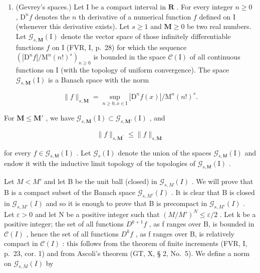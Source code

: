 \begin{enumerate}
\def\labelenumi{\alph{enumi})}
\setcounter{enumi}{2}
\tightlist
\item
  (Gevrey's spaces.) Let I be a compact interval in \(\mathbf{R}\) . For every integer \(n \geqslant 0\) , \(\mathrm{D}^n f\) denotes the \(n\) th derivative of a numerical function \(f\) defined on I (whenever this derivative exists). Let \(s \geqslant 1\) and \(\mathbf{M} \geqslant 0\) be two real numbers. Let \(\mathcal{G}_{s,\mathbf{M}}(\mathrm{I})\) denote the vector space of those infinitely differentiable functions \(f\) on I (FVR, I, p.~28) for which the sequence \((|\mathrm{D}^n f| / \mathrm{M}^n (n!)^s)_{n \geqslant 0}\) is bounded in the space \(\mathcal{C}(\mathrm{I})\) of all continuous functions on I (with the topology of uniform convergence). The space \(\mathcal{G}_{s,\mathbf{M}}(\mathrm{I})\) is a Banach space with the norm
\end{enumerate}

\[
\| f \| _ {s, \mathbf {M}} = \sup _ {n \geqslant 0, x \in \mathrm{I}} | \mathrm{D} ^ {n} f (x) | / \mathrm{M} ^ {n} (n!) ^ {s}.
\]

For \(\mathbf{M} \leqslant \mathbf{M}'\) , we have \(\mathcal{G}_{s,\mathbf{M}}(\mathrm{I}) \subset \mathcal{G}_{s,\mathbf{M}'}(\mathrm{I})\) , and

\[
\| f \| _ {s, \mathbf {M} ^ {\prime}} \leqslant \| f \| _ {s, \mathbf {M}}
\]

for every \(f \in \mathcal{G}_{s,\mathsf{M}}(\mathrm{I})\) . Let \(\mathcal{G}_s(\mathrm{I})\) denote the union of the spaces \(\mathcal{G}_{s,\mathsf{M}}(\mathrm{I})\) and endow it with the inductive limit topology of the topologies of \(\mathcal{G}_{s,\mathsf{M}}(\mathrm{I})\) .

Let \(M < M'\) and let B be the unit ball (closed) in \(\mathcal{G}_{s,M}(I)\) . We will prove that B is a compact subset of the Banach space \(\mathcal{G}_{s,M'}(I)\) . It is clear that B is closed in \(\mathcal{G}_{s,M'}(I)\) and so it is enough to prove that B is precompact in \(\mathcal{G}_{s,M'}(I)\) . Let \(\varepsilon > 0\) and let N be a positive integer such that \((M/M')^N \leqslant \varepsilon/2\) . Let k be a positive integer; the set of all functions \(D^{k+1}f\) , as f ranges over B, is bounded in \(\mathcal{C}(I)\) , hence the set of all functions \(D^k f\) , as f ranges over B, is relatively compact in \(\mathcal{C}(I)\) : this follows from the theorem of finite increments (FVR, I, p.~23, cor. 1) and from Ascoli's theorem (GT, X, § 2, No.~5). We define a norm on \(\mathcal{G}_{s,M}(I)\) by

